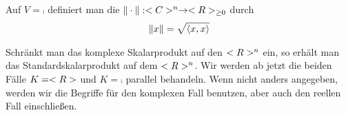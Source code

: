 \begin{definition}
	Auf $V=\comp$ definiert man die  $\Vert \cdot \Vert:<C>^n\to <R>_{\ge 0}$ durch
	\begin{align}
	\Vert x\Vert =\sqrt{\langle  x,x\rangle}\notag
	\end{align}
\end{definition}

\begin{remark}
	Schränkt man das komplexe Skalarprodukt auf den $<R>^n$ ein, so erhält man das Standardskalarprodukt auf dem $<R>^n$. Wir werden ab jetzt die beiden Fälle $K=<R>$ und $K=\comp$ parallel behandeln. Wenn nicht anders angegeben, werden wir die Begriffe für den komplexen Fall benutzen, aber auch den reellen Fall einschließen.
\end{remark}